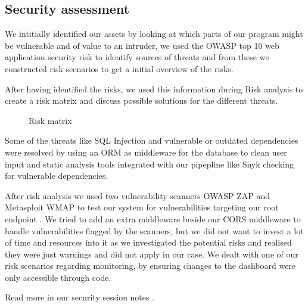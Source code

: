 \subsection{Security assessment}
We intitially identified our assets by looking at which parts of our program might be vulnerable and of value to an intruder, 
we used the OWASP top 10 web application security risk \cite{owasp-top-10} to identify sources of threats and from these we constructed risk scenarios to get a initial overview of the risks.

After having identified the risks, we used this information during Risk analysis to create a risk matrix and discuss possible solutions for the different threats. 


\begin{wrapfigure}{R}{0.38\paperwidth}
    \hspace*{0.35in}
    \caption{Risk matrix}
    \label{fig:Risk-matrix}
\end{wrapfigure}

Some of the threats like SQL Injection and vulnerable or outdated dependencies were resolved by using an ORM \cite{gorm} as middleware for the database to clean user input and static analysis tools integrated with our pipepline like Snyk \cite{snyk} checking for vulnerable dependencies.

After risk analysis we used two vulnerability scanners OWASP ZAP \cite{owasp-zap} and Metasploit \cite{metasploit} WMAP \cite{metasploit-wmap} to test our system for vulnerabilities targeting our root endpoint \cite{minitwit-root-endpoint}.
We tried to add an extra middleware beside our CORS middleware to handle vulnerabilities flagged by the scanners, but we did not want to invest a lot of time and resources into it as we investigated the potential risks and realised they were just warnings and did not apply in our case.
We dealt with one of our risk scenarios regarding monitoring, by ensuring changes to the dashboard were only accessible through code.

Read more in our security session notes \cite{repo:security-session-notes}.
